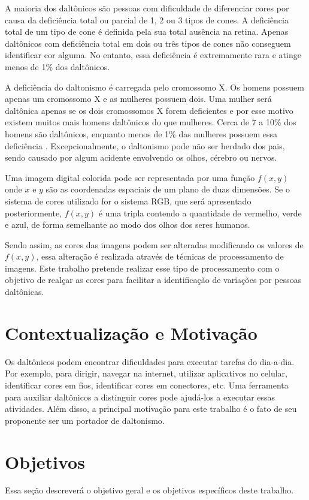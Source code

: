 \documentclass[	12pt, Times, openright, twoside, a4paper, english, brazil]{abntex2}
\begin{document}
A maioria dos daltônicos são pessoas com dificuldade de diferenciar cores por causa da deficiência total ou parcial de 1, 2 ou 3 tipos de cones. A deficiência total de um tipo de cone é definida pela sua total ausência na retina. Apenas daltônicos com deficiência total em dois ou três tipos de cones não conseguem identificar cor alguma. No entanto, essa deficiência é extremamente rara e atinge menos de 1\% dos daltônicos.

A deficiência do daltonismo é carregada pelo cromossomo X. Os homens possuem apenas um cromossomo X e as mulheres possuem dois. Uma mulher será daltônica apenas se os dois cromossomos X forem deficientes e por esse motivo existem muitos mais homens daltônicos do que mulheres. Cerca de 7 a 10\% dos homens são daltônicos, enquanto menos de 1\% das mulheres possuem essa deficiência \cite{mcdowell2008}. Excepcionalmente, o daltonismo pode não ser herdado dos pais, sendo causado por algum acidente envolvendo os olhos, cérebro ou nervos.

Uma imagem digital colorida pode ser representada por uma função $f(x, y)$ onde $x$ e $y$ são as coordenadas espaciais de um plano de duas dimensões. Se o sistema de cores utilizado for o sistema RGB, que será apresentado posteriormente, $f(x, y)$ é uma tripla contendo a quantidade de vermelho, verde e azul, de forma semelhante ao modo dos olhos dos seres humanos.

Sendo assim, as cores das imagens podem ser alteradas modificando os valores de $f(x, y)$, essa alteração é realizada através de técnicas de processamento de imagens. Este trabalho pretende realizar esse tipo de processamento com o objetivo de realçar as cores para facilitar a identificação de variações por pessoas daltônicas.

\section{Contextualização e Motivação}
Os daltônicos podem encontrar dificuldades para executar tarefas do dia-a-dia. Por exemplo, para dirigir, navegar na internet, utilizar aplicativos no celular, identificar cores em fios, identificar cores em conectores, etc. Uma ferramenta para auxiliar daltônicos a distinguir cores pode ajudá-los a executar essas atividades. Além disso, a principal motivação para este trabalho é o fato de seu proponente ser um portador de daltonismo.

\section{Objetivos}
Essa seção descreverá o objetivo geral e os objetivos específicos deste trabalho.
\end{document}

